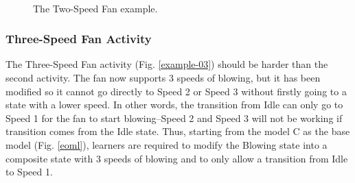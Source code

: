 \documentclass[conference]{IEEEtran}
\begin{document}
\begin{figure}[!t]
    \centering
    \\
	\caption{The Two-Speed Fan example.}
    \label{example-02}
\end{figure}

\subsubsection{Three-Speed Fan Activity}
The Three-Speed Fan activity (Fig. \ref{example-03}) should be harder than the second activity. The fan now supports 3 speeds of blowing, but it has been modified so it cannot go directly to Speed 2 or Speed 3 without firstly going to a state with a lower speed. In other words, the transition from Idle can only go to Speed 1 for the fan to start blowing--Speed 2 and Speed 3 will not be working if transition comes from the Idle state. Thus, starting from the model C as the base model (Fig. \ref{eoml}), learners are required to modify the Blowing state into a composite state with 3 speeds of blowing and to only allow a transition from Idle to Speed 1.
\end{document}
